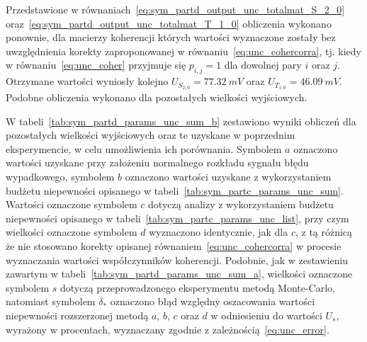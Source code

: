Przedstawione w równaniach~\eqref{eq:sym_partd_output_unc_totalmat_S_2_0} oraz~\eqref{eq:sym_partd_output_unc_totalmat_T_1_0} obliczenia wykonano ponownie, dla macierzy koherencji których wartości wyznaczone zostały bez uwzględnienia korekty zaproponowanej w równaniu~\eqref{eq:unc_cohercorra}, tj. kiedy w równaniu~\eqref{eq:unc_coher} przyjmuje się $p_{i,j} = 1$ dla dowolnej pary $i$ oraz $j$. Otrzymane wartości wyniosły kolejno $U_{S_{2,0}} = \qty{77.32}{mV}$ oraz $U_{T_{1,0}} = \qty{46.09}{mV}$. Podobne obliczenia wykonano dla pozostałych wielkości wyjściowych.

W tabeli~\ref{tab:sym_partd_params_unc_sum_b} zestawiono wyniki obliczeń dla pozostałych wielkości wyjściowych oraz te uzyskane w poprzednim eksperymencie, w celu umożliwienia ich porównania. Symbolem $a$ oznaczono wartości uzyskane przy założeniu normalnego rozkładu sygnału błędu wypadkowego, symbolem $b$ oznaczono wartości uzyskane z wykorzystaniem budżetu niepewności opisanego w tabeli~\ref{tab:sym_partc_params_unc_sum}. Wartości oznaczone symbolem $c$ dotyczą analizy z wykorzystaniem budżetu niepewności opisanego w tabeli~\ref{tab:sym_partc_params_unc_list}, przy czym wielkości oznaczone symbolem $d$ wyznaczono identycznie, jak dla $c$, z tą różnicą że nie stosowano korekty opisanej równaniem~\eqref{eq:unc_cohercorra} w procesie wyznaczania wartości współczynników koherencji. Podobnie, jak w zestawieniu zawartym w tabeli~\ref{tab:sym_partd_params_unc_sum_a}, wielkości oznaczone symbolem $s$ dotyczą przeprowadzonego eksperymentu metodą Monte-Carlo, natomiast symbolem $\delta_{*}$ oznaczono błąd względny oszacowania wartości niepewności rozszerzonej metodą $a$, $b$, $c$ oraz $d$ w odniesieniu do wartości $U_{s}$, wyrażony w procentach, wyznaczany zgodnie z zależnością~\eqref{eq:unc_error}.

